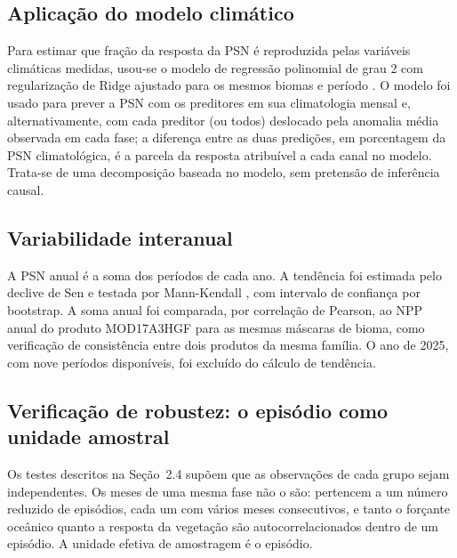 \documentclass[a4paper,fleqn]{cas-sc}
\begin{document}
\subsection{Aplicação do modelo climático}

Para estimar que fração da resposta da PSN é reproduzida pelas variáveis climáticas medidas, usou-se o modelo de regressão polinomial de grau 2 com regularização de Ridge ajustado para os mesmos biomas e período \citep{oliveira2026, hoerl1970}. O modelo foi usado para prever a PSN com os preditores em sua climatologia mensal e, alternativamente, com cada preditor (ou todos) deslocado pela anomalia média observada em cada fase; a diferença entre as duas predições, em porcentagem da PSN climatológica, é a parcela da resposta atribuível a cada canal no modelo. Trata-se de uma decomposição baseada no modelo, sem pretensão de inferência causal.

\subsection{Variabilidade interanual}

A PSN anual é a soma dos períodos de cada ano. A tendência foi estimada pelo declive de Sen \citep{sen1968} e testada por Mann-Kendall \citep{mann1945}, com intervalo de confiança por bootstrap. A soma anual foi comparada, por correlação de Pearson, ao NPP anual do produto MOD17A3HGF para as mesmas máscaras de bioma, como verificação de consistência entre dois produtos da mesma família. O ano de 2025, com nove períodos disponíveis, foi excluído do cálculo de tendência.

\subsection{Verificação de robustez: o episódio como unidade amostral}

Os testes descritos na Seção~2.4 supõem que as observações de cada grupo sejam independentes. Os meses de uma mesma fase não o são: pertencem a um número reduzido de episódios, cada um com vários meses consecutivos, e tanto o forçante oceânico quanto a resposta da vegetação são autocorrelacionados dentro de um episódio. A unidade efetiva de amostragem é o episódio.
\end{document}

